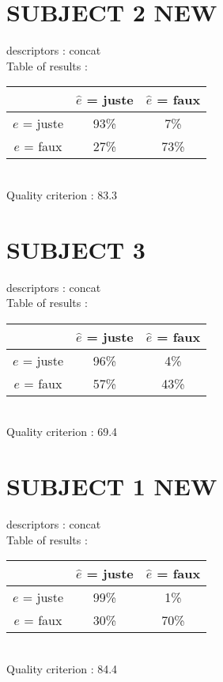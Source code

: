 \section*{SUBJECT 2 NEW}
descriptors : concat \\
Table of results : \\
\begin{tabular}{|c|c|c|}
\hline				& $\hat{e}$ = juste & $\hat{e}$ = faux \\
\hline  $e$ = juste	&     93\%			&      7\%		\\
\hline  $e$ = faux	&     27\%			&     73\%		\\
\hline
\end{tabular}\\
Quality criterion :   83.3 \\

\section*{SUBJECT 3}
descriptors : concat \\
Table of results : \\
\begin{tabular}{|c|c|c|}
\hline				& $\hat{e}$ = juste & $\hat{e}$ = faux \\
\hline  $e$ = juste	&     96\%			&      4\%		\\
\hline  $e$ = faux	&     57\%			&     43\%		\\
\hline
\end{tabular}\\
Quality criterion :   69.4 \\

\newpage
\section*{SUBJECT 1 NEW}
descriptors : concat \\
Table of results : \\
\begin{tabular}{|c|c|c|}
\hline				& $\hat{e}$ = juste & $\hat{e}$ = faux \\
\hline  $e$ = juste	&     99\%			&      1\%		\\
\hline  $e$ = faux	&     30\%			&     70\%		\\
\hline
\end{tabular}\\
Quality criterion :   84.4 \\

\newpage
